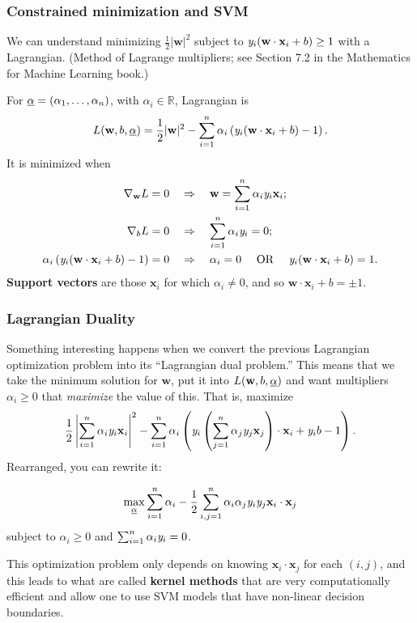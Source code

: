 \documentclass[smaller]{beamer}
\theoremstyle{example}
\newcommand{\x}{\textbf{x}}
\newcommand{\ix}[1]{{\it #1}}
\begin{document}
\begin{frame}
\frametitle{Constrained minimization and SVM}
We can understand minimizing $\frac12|\textbf{w}|^2$ subject to $\ix y_i(\textbf{w}\cdot{\x}_i + b) \ge 1$ with a Lagrangian. (Method of Lagrange multipliers; see Section 7.2 in the Mathematics for Machine Learning book.)

For $\emph{\alpha}=(\alpha_1,\ldots,\alpha_n)$, with $\alpha_i\in\mathbb R$, Lagrangian is 
    \[L(\textbf{w}, b, \emph{\alpha}) = \frac12|\textbf{w}|^2 - \sum_{i=1}^n\alpha_i\left(\ix y_i(\textbf{w}\cdot\x_i + b) - 1\right).\]
It is minimized when 
    \begin{align*}
        \nabla_{\textbf{w}}L = 0  &\quad\Rightarrow\quad \textbf{w} = \sum_{i=1}^n\alpha_i\ix y_i\x_i; \\
        \nabla_{b}L = 0  &\quad\Rightarrow\quad \sum_{i=1}^n\alpha_i\ix y_i = 0; \\ 
        \alpha_i\left(\ix y_i(\textbf{w}\cdot\x_i + b)-1\right) = 0 &\quad\Rightarrow\quad 
         \alpha_i = 0 \quad\text{ OR }\quad \ix y_i(\textbf{w}\cdot\x_i + b) = 1.
    \end{align*}
\textbf{Support vectors} are those $\x_i$ for which $\alpha_i\ne0$, and so $\textbf{w}\cdot\x_i + b = \pm 1$.
\end{frame}

\begin{frame}
\frametitle{Lagrangian Duality}
Something interesting happens when we convert the previous Lagrangian optimization problem into its ``Lagrangian dual problem.'' This means that we take the minimum solution for $\textbf{w}$, put it into $L(\textbf{w},b,\emph{\alpha})$ and want multipliers $\alpha_i\ge 0$ that \textit{maximize} the value of this. That is, maximize 
    \[\frac12\left|\sum_{i=1}^n\alpha_i\ix y_i\x_i\right|^2 - \sum_{i=1}^n\alpha_i\left(\ix y_i\left(\sum_{j=1}^n\alpha_j\ix y_j\x_j\right)\cdot\x_i + \ix y_ib - 1\right).\]
Rearranged, you can rewrite it:

    \[\max_{\emph{\alpha}} \sum_{i=1}^n\alpha_i - \frac12\sum_{i,j=1}^n\alpha_i\alpha_j\ix y_i\ix y_j \x_i\cdot\x_j\]
subject to $\alpha_i\ge 0$ and $\sum_{i=1}^n\alpha_i\ix y_i = 0$.

This optimization problem only depends on knowing $\x_i\cdot\x_j$ for each $(i,j)$, and this leads to what are called \textbf{kernel methods} that are very computationally efficient and allow one to use SVM models that have non-linear decision boundaries. 
\end{frame}
\end{document}
